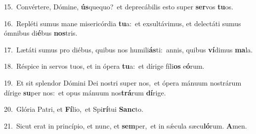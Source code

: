 {\numbfont\textcolor{\numbcolor}{15.}}~Convértere, Dómine, \textbf{ús}\-quequo?~\star et deprecábilis esto super \textbf{ser}\-vos \textbf{tu}\-os.\par
{\numbfont\textcolor{\numbcolor}{16.}}~Repléti sumus mane misericórdia \textbf{tu}\-a:~\star et exsultávimus, et delectáti sumus ómnibus di\-\textbf{é}\-bus \textbf{nos}\-tris.\par
{\numbfont\textcolor{\numbcolor}{17.}}~Lætáti sumus pro diébus, quibus nos humili\-\textbf{ás}\-ti:~\star annis, quibus \textbf{ví}\-dimus \textbf{ma}\-la.\par
{\numbfont\textcolor{\numbcolor}{18.}}~Réspice in servos tuos, et in ópera \textbf{tu}\-a:~\star et dírige fíli\textbf{os} e\-\textbf{ó}\-rum.\par
{\numbfont\textcolor{\numbcolor}{19.}}~Et sit splendor Dómini Dei nostri super nos,~\dagger et ópera mánuum nostrárum dírige \textbf{su}\-per nos:~\star et opus mánuum nos\-\textbf{trá}\-rum \textbf{dí}\-rige.\par
{\numbfont\textcolor{\numbcolor}{20.}}~Glória Patri, et \textbf{Fí}\-lio,~\star et Spi\-\textbf{rí}\-tui \textbf{Sanc}\-to.\par
{\numbfont\textcolor{\numbcolor}{21.}}~Sicut erat in princípio, et nunc, et \textbf{sem}\-per,~\star et in sǽcula sæcu\-\textbf{ló}\-rum. \textbf{A}\-men.\par
